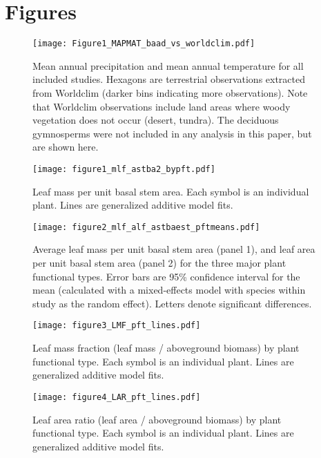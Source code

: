 \documentclass[a4paper]{article}\usepackage[]{graphicx}\usepackage[]{color}
\begin{document}
\clearpage
\section{Figures}


\begin{figure}[h!]
    \centering
    \texttt{[image: Figure1\_MAPMAT\_baad\_vs\_worldclim.pdf]}
    \caption{Mean annual precipitation and mean annual temperature for all included studies. Hexagons are terrestrial observations extracted from Worldclim (darker bins indicating more observations). Note that Worldclim observations include land areas where woody vegetation does not occur (desert, tundra). The deciduous gymnosperms were not included in any analysis in this paper, but are shown here.  }
    \label{fig:figureworldclim}
\end{figure}


\begin{figure}[h!]
    \centering
    \texttt{[image: figure1\_mlf\_astba2\_bypft.pdf]}
    \caption{Leaf mass per unit basal stem area. Each symbol is an individual plant. Lines are generalized additive model fits.}
    \label{fig:figure1}
\end{figure}

\begin{figure}[h!]
    \centering
    \texttt{[image: figure2\_mlf\_alf\_astbaest\_pftmeans.pdf]}
    \caption{Average leaf mass per unit basal stem area (panel 1), and leaf area per unit basal stem area (panel 2) for the three major plant functional types. Error bars are 95\% confidence interval for the mean (calculated with a mixed-effects model with species within study as the random effect). Letters denote significant differences. }
    \label{fig:figure2}
\end{figure}


\begin{figure}[h!]
    \centering
    \texttt{[image: figure3\_LMF\_pft\_lines.pdf]}
    \caption{Leaf mass fraction (leaf mass / aboveground biomass) by plant functional type. Each symbol is an individual plant. Lines are generalized additive model fits.}
    \label{fig:figure3}
\end{figure}

\begin{figure}[h!]
    \centering
    \texttt{[image: figure4\_LAR\_pft\_lines.pdf]}
    \caption{Leaf area ratio (leaf area / aboveground biomass) by plant functional type. Each symbol is an individual plant. Lines are generalized additive model fits.}
    \label{fig:figure4}
\end{figure}
\end{document}
